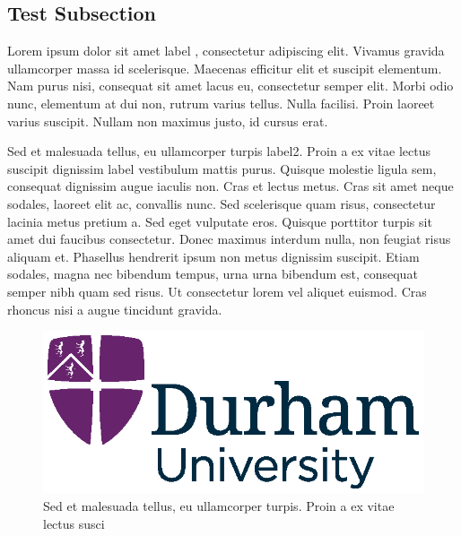 \documentclass[final]{durchemreport}
\begin{document}
\subsection{Test Subsection}
Lorem ipsum dolor sit amet \gls{label} , consectetur adipiscing elit. Vivamus gravida ullamcorper massa id scelerisque. Maecenas efficitur elit et suscipit elementum. Nam purus nisi, consequat sit amet lacus eu, consectetur semper elit. Morbi odio nunc, elementum at dui non, rutrum varius tellus. Nulla facilisi. Proin laoreet varius suscipit. Nullam non maximus justo, id cursus erat.

Sed et malesuada tellus, eu ullamcorper turpis \gls{label2}. Proin a ex vitae lectus suscipit dignissim \gls{label} vestibulum mattis purus. Quisque molestie ligula sem, consequat dignissim augue iaculis non. Cras et lectus metus. Cras sit amet neque sodales, laoreet elit ac, convallis nunc. Sed scelerisque quam risus, consectetur lacinia metus pretium a. Sed eget vulputate eros. Quisque porttitor turpis sit amet dui faucibus consectetur. Donec maximus interdum nulla, non feugiat risus aliquam et. Phasellus hendrerit ipsum non metus dignissim suscipit. Etiam sodales, magna nec bibendum tempus, urna urna bibendum est, consequat semper nibh quam sed risus. Ut consectetur lorem vel aliquet euismod. Cras rhoncus nisi a augue tincidunt gravida.


\begin{figure}
    \centering
    \includegraphics[width=\linewidth]{DU.eps}
    \caption[This is a caption for the list of figures]{Sed et malesuada tellus, eu ullamcorper turpis. Proin a ex vitae lectus susci}
    \label{testfig}
\end{figure}

%


\printbibliography



\end{document}
